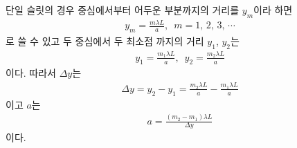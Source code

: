 \documentclass[tightenlines,floatfix,nofootinbib,superscriptaddress,fleqn]{revtex4}
\begin{document}
단일 슬릿의 경우 중심에서부터 어두운 부분까지의 거리를 $y_m$이라 하면
\begin{align}
  y_m = \frac{m\lambda L}{a},\,\,\,m=1,\,2,\,3,\,\cdots
\end{align}
로 쓸 수 있고 두 중심에서 두 최소점 까지의 거리 $y_1$, $y_2$는
\begin{align}
  y_1=\frac{m_1\lambda L}{a} ,\,\,\,y_2=\frac{m_2\lambda L}{a}
\end{align}
이다. 따라서 $\Delta y$는
\begin{align}
  \Delta y = y_2-y_1 = \frac{m_2\lambda L}{a} - \frac{m_1\lambda L}{a}
\end{align}
이고 $a$는
\begin{align}
  a = \frac{(m_2-m_1)\lambda L}{\Delta y}
\end{align}
이다.
\vspace{1cm}
\end{document}
